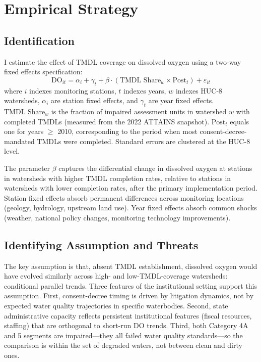 \documentclass[12pt]{article}
\begin{document}



\section{Empirical Strategy}
\label{sec:strategy}

\subsection{Identification}

I estimate the effect of TMDL coverage on dissolved oxygen using a two-way fixed effects specification:
\begin{equation}
\text{DO}_{it} = \alpha_i + \gamma_t + \beta \cdot (\text{TMDL Share}_w \times \text{Post}_t) + \varepsilon_{it}
\label{eq:main}
\end{equation}
where $i$ indexes monitoring stations, $t$ indexes years, $w$ indexes HUC-8 watersheds, $\alpha_i$ are station fixed effects, and $\gamma_t$ are year fixed effects. $\text{TMDL Share}_w$ is the fraction of impaired assessment units in watershed $w$ with completed TMDLs (measured from the 2022 ATTAINS snapshot). $\text{Post}_t$ equals one for years $\geq$ 2010, corresponding to the period when most consent-decree-mandated TMDLs were completed. Standard errors are clustered at the HUC-8 level.

The parameter $\beta$ captures the differential change in dissolved oxygen at stations in watersheds with higher TMDL completion rates, relative to stations in watersheds with lower completion rates, after the primary implementation period. Station fixed effects absorb permanent differences across monitoring locations (geology, hydrology, upstream land use). Year fixed effects absorb common shocks (weather, national policy changes, monitoring technology improvements).

\subsection{Identifying Assumption and Threats}

The key assumption is that, absent TMDL establishment, dissolved oxygen would have evolved similarly across high- and low-TMDL-coverage watersheds: conditional parallel trends. Three features of the institutional setting support this assumption. First, consent-decree timing is driven by litigation dynamics, not by expected water quality trajectories in specific waterbodies. Second, state administrative capacity reflects persistent institutional features (fiscal resources, staffing) that are orthogonal to short-run DO trends. Third, both Category 4A and 5 segments are impaired---they all failed water quality standards---so the comparison is within the set of degraded waters, not between clean and dirty ones.
\end{document}
